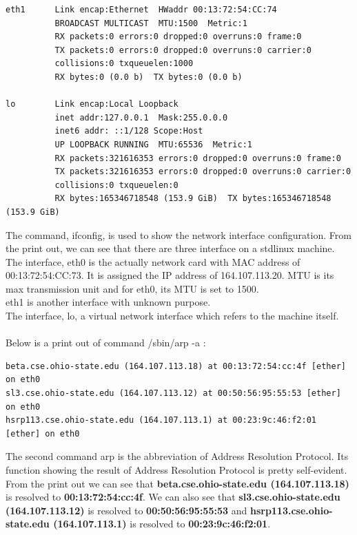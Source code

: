 \documentclass[12pt]{article}
\begin{document}
\begin{singlespace}
\begin{enumerate}
\begin{lstlisting}[basicstyle=\ttfamily\scriptsize]
eth1      Link encap:Ethernet  HWaddr 00:13:72:54:CC:74  
          BROADCAST MULTICAST  MTU:1500  Metric:1
          RX packets:0 errors:0 dropped:0 overruns:0 frame:0
          TX packets:0 errors:0 dropped:0 overruns:0 carrier:0
          collisions:0 txqueuelen:1000 
          RX bytes:0 (0.0 b)  TX bytes:0 (0.0 b)

lo        Link encap:Local Loopback  
          inet addr:127.0.0.1  Mask:255.0.0.0
          inet6 addr: ::1/128 Scope:Host
          UP LOOPBACK RUNNING  MTU:65536  Metric:1
          RX packets:321616353 errors:0 dropped:0 overruns:0 frame:0
          TX packets:321616353 errors:0 dropped:0 overruns:0 carrier:0
          collisions:0 txqueuelen:0 
          RX bytes:165346718548 (153.9 GiB)  TX bytes:165346718548 (153.9 GiB)
	\end{lstlisting}
The command, ifconfig, is used to show the network interface configuration. From the print out, we can see that there are three interface on a stdlinux machine. The interface, eth0 is the actually network card with MAC address of 00:13:72:54:CC:73. It is assigned the IP address of 164.107.113.20. MTU is its max transmission unit and for eth0, its MTU is set to 1500.\\
eth1 is another interface with unknown purpose.\\
The interface, lo, a virtual network interface which refers to the machine itself.\\\\

Below is a print out of command /sbin/arp -a :
	\begin{lstlisting}[basicstyle=\ttfamily\scriptsize]
% /sbin/arp -a
beta.cse.ohio-state.edu (164.107.113.18) at 00:13:72:54:cc:4f [ether] on eth0
sl3.cse.ohio-state.edu (164.107.113.12) at 00:50:56:95:55:53 [ether] on eth0
hsrp113.cse.ohio-state.edu (164.107.113.1) at 00:23:9c:46:f2:01 [ether] on eth0
	\end{lstlisting}
The second command arp is the abbreviation of Address Resolution Protocol. Its function showing the result of Address Resolution Protocol is pretty self-evident.\\
From the print out we can see that \textbf{beta.cse.ohio-state.edu (164.107.113.18)} is resolved to \textbf{00:13:72:54:cc:4f}. We can also see that \textbf{sl3.cse.ohio-state.edu (164.107.113.12)} is resolved to \textbf{00:50:56:95:55:53} and \textbf{hsrp113.cse.ohio-state.edu (164.107.113.1)} is resolved to \textbf{00:23:9c:46:f2:01}.
\end{enumerate}
\end{singlespace}

\clearpage

\printbibliography
\end{document}
